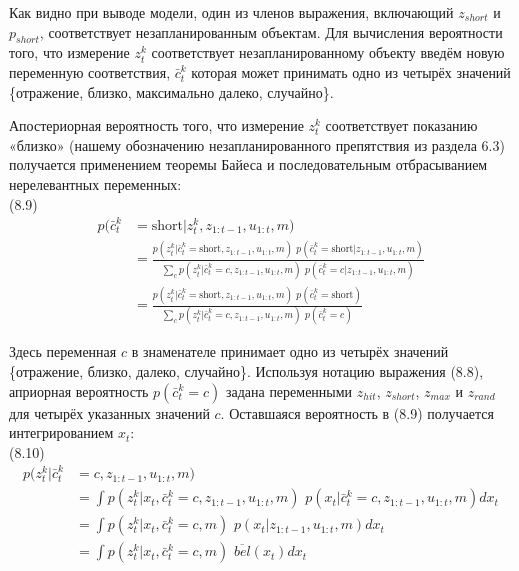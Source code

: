 \documentclass[10pt,a4paper]{article}
\begin{document}
Как видно при выводе модели, один из членов выражения, включающий $z_{short}$ и $p_{short}$, соответствует незапланированным объектам. Для вычисления вероятности того, что измерение $z_t^k$ соответствует незапланированному объекту введём новую переменную соответствия, $\bar{c}_t^k$ которая может принимать одно из четырёх значений \{отражение, близко, максимально далеко, случайно\}.
 
Апостериорная вероятность того, что измерение $z_t^k$ соответствует показанию «близко» (нашему обозначению незапланированного препятствия из раздела 6.3) получается применением теоремы Байеса и последовательным отбрасыванием нерелевантных переменных:\\

(8.9)
\begin{equation*}
\begin{split}
p(\bar{c}_t^k&=\text{short}|z_t^k,z_{1:t-1},u_{1:t},m)\\
&=\frac{p(z_t^k|\bar{c}_t^k=\text{short},z_{1:t-1},u_{1:t},m)\,\,p(\bar{c}_t^k=\text{short}|z_{1:t-1},u_{1:t},m)}{\sum_c p(z_t^k|\bar{c}_t^k=c,z_{1:t-1},u_{1:t},m)\,\,p(\bar{c}_t^k=c|z_{1:t-1},u_{1:t},m)}\\
&=\frac{p(z_t^k|\bar{c}_t^k=\text{short},z_{1:t-1},u_{1:t},m)\,\,p(\bar{c}_t^k=\text{short})}{\sum_c p(z_t^k|\bar{c}_t^k=c,z_{1:t-1},u_{1:t},m)\,\,p(\bar{c}_t^k=c)}
\end{split}
\end{equation*} 
 
Здесь переменная $c$ в знаменателе принимает одно из четырёх значений \{отражение, близко, далеко, случайно\}. Используя нотацию выражения (8.8), априорная вероятность $p(\bar{c}_t^k=c)$ задана переменными $z_{hit}$, $z_{short}$, $z_{max}$ и $z_{rand}$ для четырёх указанных значений $c$. Оставшаяся вероятность в (8.9) получается интегрированием $x_t$:\\

(8.10)
\begin{equation*}
\begin{split}
p(z_t^k|\bar{c}_t^k&=c,z_{1:t-1},u_{1:t},m)\\
&=\int p(z_t^k|x_t,\bar{c}_t^k=c,z_{1:t-1},u_{1:t},m)\,\,p(x_t|\bar{c}_t^k=c,z_{1:t-1},u_{1:t},m)dx_t\\
&=\int p(z_t^k|x_t,\bar{c}_t^k=c,m)\,\,p(x_t|z_{1:t-1},u_{1:t},m)dx_t\\
&=\int p(z_t^k|x_t,\bar{c}_t^k=c,m)\,\,\overline{bel}(x_t)dx_t
\end{split}
\end{equation*} 
 
\end{document}
